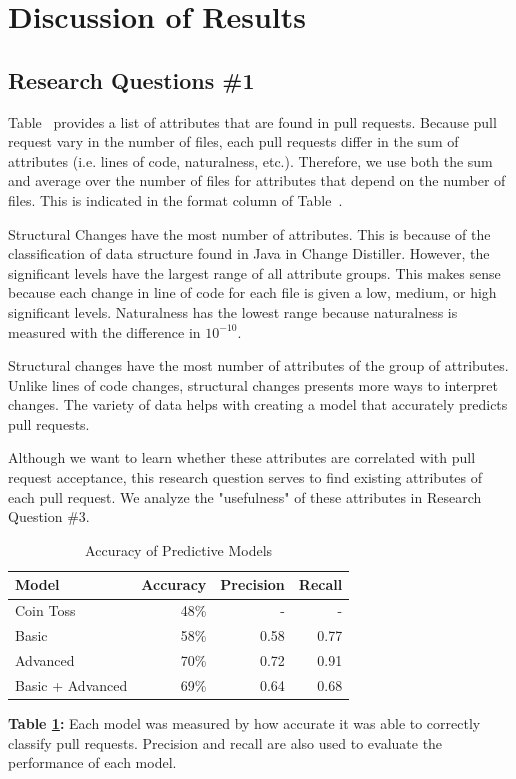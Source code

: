 \documentclass[10pt, conference]{IEEEtran}
\begin{document}
\section{Discussion of Results}
\label{discussion}
\subsection{Research Questions \#1}
Table~\cite{figureListOfMetrics} provides a list of attributes that are found in pull requests. Because pull request vary in the number of files, each pull requests differ in the sum of attributes (i.e. lines of code, naturalness, etc.). Therefore, we use both the sum and average over the number of files for attributes that depend on the number of files. This is indicated in the format column of Table~\cite{figureListOfMetrics}.

Structural Changes have the most number of attributes. This is because of the classification of data structure found in Java in Change Distiller. However, the significant levels have the largest range of all attribute groups. This makes sense because each change in line of code for each file is given a low, medium, or high significant levels. Naturalness has the lowest range because naturalness is measured with the difference in $10^{-10}$.

Structural changes have the most number of attributes of the group of attributes. Unlike lines of code changes, structural changes presents more ways to interpret changes. The variety of data helps with creating a model that accurately predicts pull requests.

Although we want to learn whether these attributes are correlated with pull request acceptance, this research question serves to find existing attributes of each pull request. We analyze the "usefulness" of these attributes in Research Question \#3.

\begin{table}[h!]
  \centering
  \caption{Accuracy of Predictive Models}
  \label{figurePredictionModels}
  \begin{tabular}{lrrr}
    \toprule
    \textbf {Model} & \textbf{Accuracy} & \textbf{Precision} & \textbf{Recall}\\ %
    \midrule
    Coin Toss & 48\% & - & - \\ %
    Basic & 58\% & 0.58 & 0.77\\ %
    Advanced & 70\% & 0.72 & 0.91\\ %
    Basic + Advanced & 69\% & 0.64 & 0.68\\ %
    \bottomrule
  \end{tabular}
  \break
  \break
\textbf{Table \ref{figurePredictionModels}:} Each model was measured by how accurate it was able to correctly classify pull requests. Precision and recall are also used to evaluate the performance of each model.
\end{table}
\end{document}
